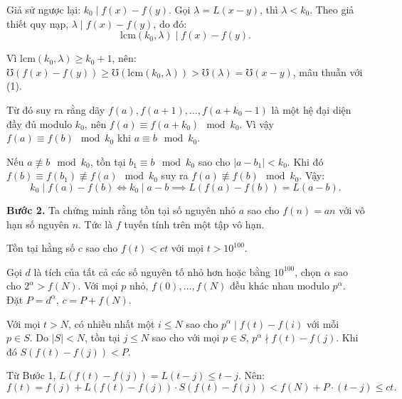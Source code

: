 \begin{problem}
\begin{soln}
    \begin{subproof}
        Giả sử ngược lại: \( k_0 \mid f(x) - f(y) \). Gọi \( \lambda = L(x - y) \), thì \( \lambda < k_0 \). 
        Theo giả thiết quy nạp, \( \lambda \mid f(x) - f(y) \), do đó:
        \[
            \text{lcm}(k_0, \lambda) \mid f(x) - f(y).
        \]

        Vì \( \text{lcm}(k_0, \lambda) \ge k_0 + 1 \), nên:
        $\mho(f(x) - f(y)) \ge \mho(\text{lcm}(k_0, \lambda)) > \mho(\lambda) = \mho(x - y)$, mâu thuẫn với (1).
    \end{subproof}

    Từ đó suy ra rằng dãy \( f(a), f(a+1), \ldots, f(a+k_0-1) \) là một hệ đại diện đầy đủ modulo \( k_0 \), nên \( f(a) \equiv f(a + k_0) \mod k_0 \). 
    Vì vậy \( f(a) \equiv f(b) \mod k_0 \) khi \( a \equiv b \mod k_0 \).

    Nếu \( a \not\equiv b \mod k_0 \), tồn tại \( b_1 \equiv b \mod k_0 \) sao cho \( |a - b_1| < k_0 \). 
    Khi đó \( f(b) \equiv f(b_1) \not\equiv f(a) \mod k_0 \) suy ra \( f(a) \not\equiv f(b) \mod k_0 \). Vậy:
    \[
        k_0 \mid f(a) - f(b) \Leftrightarrow k_0 \mid a - b \implies L(f(a) - f(b)) = L(a - b).
    \]

    \textbf{Bước 2.} Ta chứng minh rằng tồn tại số nguyên nhỏ \( a \) sao cho \( f(n) = an \) với vô hạn số nguyên \( n \). 
    Tức là \( f \) tuyến tính trên một tập vô hạn.

    \begin{claim*}
        Tồn tại hằng số \( c \) sao cho \( f(t) < ct \) với mọi \( t > 10^{100} \).
    \end{claim*}

    \begin{subproof}
        Gọi \( d \) là tích của tất cả các số nguyên tố nhỏ hơn hoặc bằng \( 10^{100} \), chọn \( \alpha \) sao cho \( 2^\alpha > f(N) \). 
        Với mọi \( p \) nhỏ, \( f(0), \ldots, f(N) \) đều khác nhau modulo \( p^\alpha \). Đặt \( P = d^\alpha \), \( c = P + f(N) \).

        Với mọi \( t > N \), có nhiều nhất một \( i \le N \) sao cho \( p^\alpha \mid f(t) - f(i) \) với mỗi \( p \in S \).
        Do \( |S| < N \), tồn tại \( j \le N \) sao cho với mọi \( p \in S \), \( p^\alpha \nmid f(t) - f(j) \). Khi đó \( S(f(t) - f(j)) < P \).

        Từ Bước 1, \( L(f(t) - f(j)) = L(t - j) \le t - j \). Nên:
        \[
            f(t) = f(j) + L(f(t) - f(j)) \cdot S(f(t) - f(j)) < f(N) + P \cdot (t - j) \le ct.
        \]
    \end{subproof}


\end{soln}
\end{problem}
